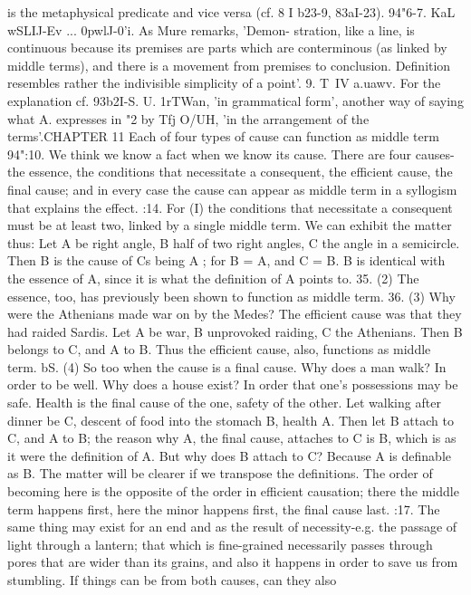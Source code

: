{{{{{{{{{{{{{{{{{{{{{{{{{{{{{{{{{{{{{{{{{{{{{{{{{{{{{{{{{is the metaphysical predicate and vice versa (cf. 8 I b23-9, 83aI-23).
94"6-7. KaL wSLIJ-Ev ... 0pwlJ-0'i. As Mure remarks, 'Demon-
stration, like a line, is continuous because its premises are parts
which are conterminous (as linked by middle terms), and there
is a movement from premises to conclusion. Definition resembles
rather the indivisible simplicity of a point'.
9. T~IV a.uawv. For the explanation cf. 93b2I-S.
U. 1rTWan, 'in grammatical form', another way of saying what
A. expresses in "2 by Tfj O/UH, 'in the arrangement of the terms'.CHAPTER 11
Each of four types of cause can function as middle term
94":10. We think we know a fact when we know its cause.
There are four causes-the essence, the conditions that necessitate
a consequent, the efficient cause, the final cause; and in every
case the cause can appear as middle term in a syllogism that
explains the effect.
:14. For (I) the conditions that necessitate a consequent must
be at least two, linked by a single middle term. We can exhibit
the matter thus: Let A be right angle, B half of two right angles,
C the angle in a semicircle. Then B is the cause of Cs being A ;
for B = A, and C = B. B is identical with the essence of A,
since it is what the definition of A points to.
35. (2) The essence, too, has previously been shown to function
as middle term.
36. (3) Why were the Athenians made war on by the Medes?
The efficient cause was that they had raided Sardis. Let A be
war, B unprovoked raiding, C the Athenians. Then B belongs
to C, and A to B. Thus the efficient cause, also, functions as
middle term.
bS. (4) So too when the cause is a final cause. Why does a man
walk? In order to be well. Why does a house exist? In order
that one's possessions may be safe. Health is the final cause of
the one, safety of the other. Let walking after dinner be C,
descent of food into the stomach B, health A. Then let B attach
to C, and A to B; the reason why A, the final cause, attaches to
C is B, which is as it were the definition of A. But why does B
attach to C? Because A is definable as B. The matter will be
clearer if we transpose the definitions. The order of becoming here
is the opposite of the order in efficient causation; there the middle
term happens first, here the minor happens first, the final cause
last.
:17. The same thing may exist for an end and as the result of
necessity-e.g. the passage of light through a lantern; that which
is fine-grained necessarily passes through pores that are wider
than its grains, and also it happens in order to save us from
stumbling. If things can be from both causes, can they also
}}}}}}}}}}}}}}}}}}}}}}}}}}}}}}}}}}}}}}}}}}}}}}}}}}}}}}}}}
